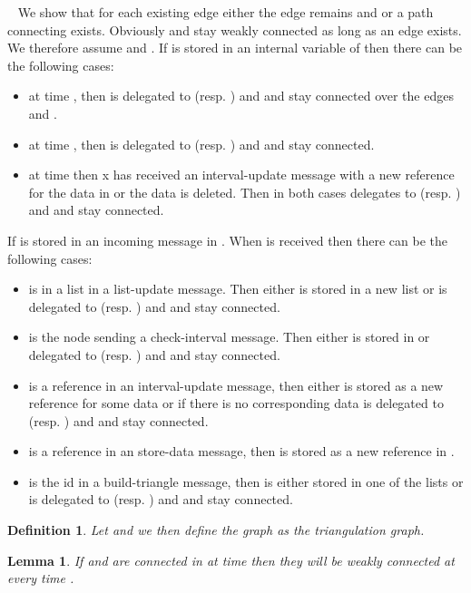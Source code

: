 \documentclass[11pt]{article}
\newtheorem{lemma}[theorem]{Lemma}
\newtheorem{definition}[theorem]{Definition}
\newcommand{\sq}{\hbox{\rlap{}}}
\newcommand{\qed}{\hspace*{\fill}\sq}
\newenvironment{proof}{\noindent {\bf Proof.}\ }{\qed\par\vskip 4mm\par}
\begin{document}
\begin{proof}
We show that for each existing edge  either the edge remains and  or a path connecting  exists. Obviously  and  stay weakly connected as long as an edge  exists. We therefore assume  and . If  is stored in an internal variable of  then there can be the following cases:

\begin{itemize}
  \item  at time , then  is delegated to  (resp. ) and  and  stay connected over the edges  and .
  \item  at time , then  is delegated to  (resp. ) and  and  stay connected.
  \item  at time  then x has received an interval-update message with a new reference for the data in  or the data is deleted. Then in both cases  delegates  to  (resp. ) and  and  stay connected.
\end{itemize}

If  is stored in an incoming message  in . When  is received then there can be the following cases:

\begin{itemize}
  \item  is in a list in a list-update message. Then either  is stored in a new list  or  is delegated to  (resp. ) and  and  stay connected.
  \item  is the node sending a check-interval message. Then either  is stored in  or delegated to  (resp. ) and  and  stay connected.
  \item  is a reference in an interval-update message, then either  is stored as a new reference for some data or if there is no corresponding data  is delegated to  (resp. ) and  and  stay connected.
  \item  is a reference in an store-data message, then  is stored as a new reference in .
  \item  is the id in a build-triangle message, then  is either stored in one of the lists  or  is delegated to  (resp. ) and  and  stay connected.
\end{itemize}
\end{proof}


\begin{definition}\label{def:TriangulationGraph}
Let  and   \newline  we then define the graph  as the \emph{triangulation graph}.
\end{definition}

\begin{lemma} \label{lem:TriConnectivity}
If  and  are connected in  at time  then they will be weakly connected at every time .
\end{lemma}
\end{document}
